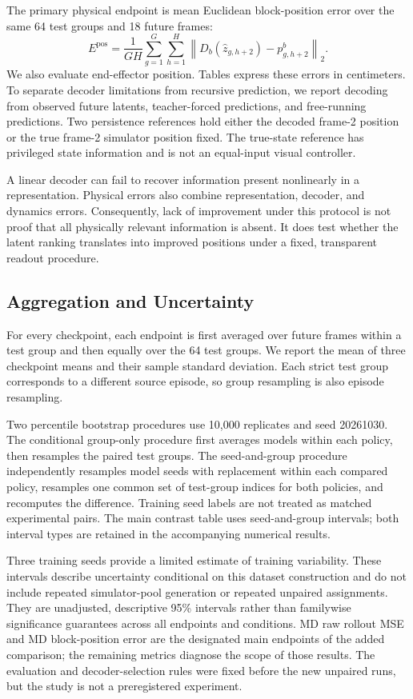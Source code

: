 The primary physical endpoint is mean Euclidean block-position error over the same 64 test groups and 18 future frames:
\begin{equation}
 E^{\mathrm{pos}}=\frac{1}{GH}\sum_{g=1}^{G}\sum_{h=1}^{H}
 \left\|D_b(\hat z_{g,h+2})-p^b_{g,h+2}\right\|_2.
\end{equation}
We also evaluate end-effector position. Tables express these errors in centimeters. To separate decoder limitations from recursive prediction, we report decoding from observed future latents, teacher-forced predictions, and free-running predictions. Two persistence references hold either the decoded frame-2 position or the true frame-2 simulator position fixed. The true-state reference has privileged state information and is not an equal-input visual controller.

A linear decoder can fail to recover information present nonlinearly in a representation. Physical errors also combine representation, decoder, and dynamics errors. Consequently, lack of improvement under this protocol is not proof that all physically relevant information is absent. It does test whether the latent ranking translates into improved positions under a fixed, transparent readout procedure.

\subsection{Aggregation and Uncertainty}
\label{sec:stats}
For every checkpoint, each endpoint is first averaged over future frames within a test group and then equally over the 64 test groups. We report the mean of three checkpoint means and their sample standard deviation. Each strict test group corresponds to a different source episode, so group resampling is also episode resampling.

Two percentile bootstrap procedures use 10,000 replicates and seed 20261030. The conditional group-only procedure first averages models within each policy, then resamples the paired test groups. The seed-and-group procedure independently resamples model seeds with replacement within each compared policy, resamples one common set of test-group indices for both policies, and recomputes the difference. Training seed labels are not treated as matched experimental pairs. The main contrast table uses seed-and-group intervals; both interval types are retained in the accompanying numerical results.

Three training seeds provide a limited estimate of training variability. These intervals describe uncertainty conditional on this dataset construction and do not include repeated simulator-pool generation or repeated unpaired assignments. They are unadjusted, descriptive 95\% intervals rather than familywise significance guarantees across all endpoints and conditions. MD raw rollout MSE and MD block-position error are the designated main endpoints of the added comparison; the remaining metrics diagnose the scope of those results. The evaluation and decoder-selection rules were fixed before the new unpaired runs, but the study is not a preregistered experiment.

